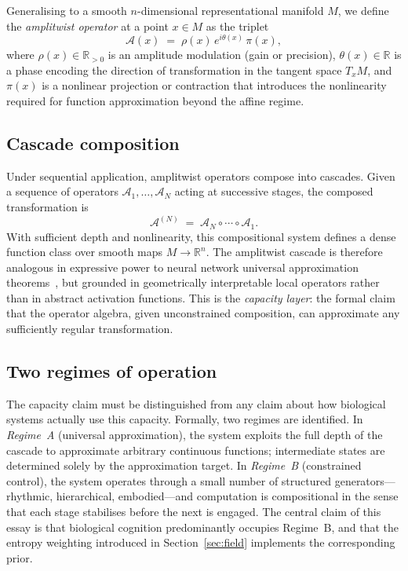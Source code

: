 \documentclass[12pt, a4paper]{article}
\theoremstyle{remark}
\theoremstyle{definition}
\newcommand{\A}{\mathcal{A}}
\begin{document}
Generalising to a smooth $n$-dimensional representational manifold $M$, we define the
\emph{amplitwist operator} at a point $x \in M$ as the triplet
\begin{equation}
  \A(x) \;=\; \rho(x)\, e^{i\theta(x)}\, \pi(x),
  \label{eq:operator}
\end{equation}
where $\rho(x) \in \mathbb{R}_{>0}$ is an amplitude modulation (gain or precision),
$\theta(x) \in \mathbb{R}$ is a phase encoding the direction of transformation in the
tangent space $T_x M$, and $\pi(x)$ is a nonlinear projection or contraction that
introduces the nonlinearity required for function approximation beyond the affine regime.

\subsection{Cascade composition}

Under sequential application, amplitwist operators compose into cascades.  Given a sequence
of operators $\A_1, \ldots, \A_N$ acting at successive stages, the composed transformation
is
\begin{equation}
  \A^{(N)} \;=\; \A_N \circ \cdots \circ \A_1.
  \label{eq:cascade}
\end{equation}
With sufficient depth and nonlinearity, this compositional system defines a dense function
class over smooth maps $M \to \mathbb{R}^n$.  The amplitwist cascade is therefore
analogous in expressive power to neural network universal approximation theorems~\cite{conway1978functions,evans2010pde}, but
grounded in geometrically interpretable local operators rather than in abstract activation
functions.  This is the \emph{capacity layer}: the formal claim that the operator algebra,
given unconstrained composition, can approximate any sufficiently regular transformation.

\subsection{Two regimes of operation}

The capacity claim must be distinguished from any claim about how biological systems
actually use this capacity.  Formally, two regimes are identified.  In \emph{Regime~A}
(universal approximation), the system exploits the full depth of the cascade to approximate
arbitrary continuous functions; intermediate states are determined solely by the
approximation target.  In \emph{Regime~B} (constrained control), the system operates
through a small number of structured generators---rhythmic, hierarchical,
embodied---and computation is compositional in the sense that each stage stabilises before
the next is engaged.  The central claim of this essay is that biological cognition
predominantly occupies Regime~B, and that the entropy weighting introduced in
Section~\ref{sec:field} implements the corresponding prior.
\end{document}
